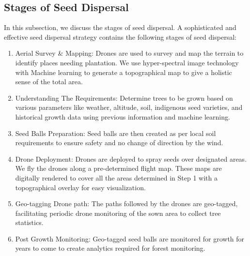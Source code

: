 \documentclass[conference]{IEEEtran}
\begin{document}
\subsection{Stages of Seed Dispersal}
In this subsection, we discuss the stages of seed dispersal. A sophisticated and effective seed dispersal strategy contains the following stages of seed dispersal:
\begin{enumerate}
\item Aerial Survey \& Mapping: Drones are used to survey and map the terrain to identify places needing plantation. We use hyper-spectral image technology with Machine learning to generate a topographical map to give a holistic sense of the total area.

\item  Understanding The Requirements: Determine trees to be grown based on various parameters like weather, altitude, soil, indigenous seed varieties, and historical growth data using previous information and machine learning.

\item  Seed Balls Preparation: Seed balls are then created as per local soil requirements to ensure safety and no change of direction by the wind.

\item Drone Deployment: Drones are deployed to spray seeds over designated areas. We fly the drones along a pre-determined flight map. These maps are digitally rendered to cover all the areas determined in Step 1 with a topographical overlay for easy visualization.

\item Geo-tagging Drone path: The paths followed by the drones are geo-tagged, facilitating periodic drone monitoring\cite{8} of the sown area to collect tree statistics.

\item Post Growth Monitoring: Geo-tagged seed balls are monitored for growth for years to come to create analytics required for forest monitoring.
\end{enumerate}
\end{document}
